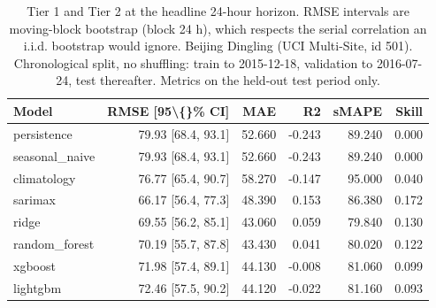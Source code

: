 \begin{table}[htbp]
\caption{Tier 1 and Tier 2 at the headline 24-hour horizon. RMSE intervals are moving-block bootstrap (block 24 h), which respects the serial correlation an i.i.d. bootstrap would ignore. Beijing Dingling (UCI Multi-Site, id 501). Chronological split, no shuffling: train to 2015-12-18, validation to 2016-07-24, test thereafter. Metrics on the held-out test period only.}
\label{tab:tier1_tier2_h24}
\begin{tabular}{lrrrrr}
\toprule
Model & RMSE [95\textbackslash\{\}\% CI] & MAE & R2 & sMAPE & Skill \\
\midrule
persistence & 79.93 [68.4, 93.1] & 52.660 & -0.243 & 89.240 & 0.000 \\
seasonal\_naive & 79.93 [68.4, 93.1] & 52.660 & -0.243 & 89.240 & 0.000 \\
climatology & 76.77 [65.4, 90.7] & 58.270 & -0.147 & 95.000 & 0.040 \\
sarimax & 66.17 [56.4, 77.3] & 48.390 & 0.153 & 86.380 & 0.172 \\
ridge & 69.55 [56.2, 85.1] & 43.060 & 0.059 & 79.840 & 0.130 \\
random\_forest & 70.19 [55.7, 87.8] & 43.430 & 0.041 & 80.020 & 0.122 \\
xgboost & 71.98 [57.4, 89.1] & 44.130 & -0.008 & 81.060 & 0.099 \\
lightgbm & 72.46 [57.5, 90.2] & 44.120 & -0.022 & 81.160 & 0.093 \\
\bottomrule
\end{tabular}
\end{table}

